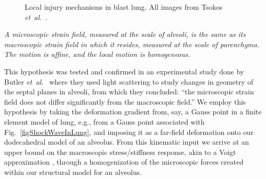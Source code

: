 \begin{figure}
    \centering
    \hfill
    \hfill
    \caption{Local injury mechanisms in blast lung. All images from Tsokos \textit{et~al}.\ \cite{Tsokosetal03}.}
    \label{figAlveolarDamage}
\end{figure}

\begin{conj}
\textit{A micro\-scopic strain field, measured at the scale of alveoli, is the same as its macro\-scopic strain field in which it resides, measured at the scale of parenchyma.  The motion is affine, and the local motion is homogeneous.}  
\label{conjecture}
\end{conj}

This hypothesis was tested and confirmed in an experimental study done by Butler \textit{et~al}.\ \cite{Butleretal96} where they used light scattering to study changes in geometry of the septal planes in alveoli, from which they concluded: ``the micro\-scopic strain field does not differ significantly from the macro\-scopic field.''  We employ this hypothesis by taking the deformation gradient from, say, a Gauss point in a finite element model of lung, e.g., from a Gauss point associated with Fig.~\ref{figShockWaveInLung}, and imposing it as a far-field deformation onto our dodecahedral model of an alveolus.  From this kinematic input we arrive at an upper bound on the macro\-scopic stress\slash stiffness response, akin to a Voigt approximation \cite{nemat1999,clayton2011}, through a homogenization of the micro\-scopic forces created within our structural model for an alveolus.

